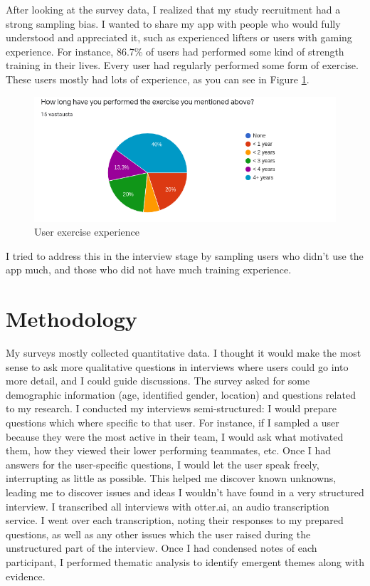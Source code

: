 \documentclass{l4proj}
\begin{document}
After looking at the survey data, I realized that my study recruitment had a strong sampling bias. I wanted to share my app with people who would fully understood and appreciated it, such as experienced lifters or users with gaming experience. For instance, 86.7\% of users had performed some kind of strength training in their lives. Every user had regularly performed some form of exercise. These users mostly had lots of experience, as you can see in Figure \ref{fig:long_performed}.
\begin{figure}[H]
    \centering
    \includegraphics[width=1.0\linewidth]{long_performed.png}    
    \caption{User exercise experience}
    \label{fig:long_performed} 
\end{figure}

I tried to address this in the interview stage by sampling users who didn't use the app much, and those who did not have much training experience. 


\section{Methodology}
My surveys mostly collected quantitative data. I thought it would make the most sense to ask more qualitative questions in interviews where users could go into more detail, and I could guide discussions. The survey asked for some demographic information (age, identified gender, location) and questions related to my research. I conducted my interviews semi-structured: I would prepare questions which where specific to that user. For instance, if I sampled a user because they were the most active in their team, I would ask what motivated them, how they viewed their lower performing teammates, etc. Once I had answers for the user-specific questions, I would let the user speak freely, interrupting as little as possible. This helped me discover known unknowns, leading me to discover issues and ideas I wouldn't have found in a very structured interview. I transcribed all interviews with otter.ai, an audio transcription service. I went over each transcription, noting their responses to my prepared questions, as well as any other issues which the user raised during the unstructured part of the interview. Once I had condensed notes of each participant, I performed thematic analysis to identify emergent themes along with evidence. 
\end{document}
